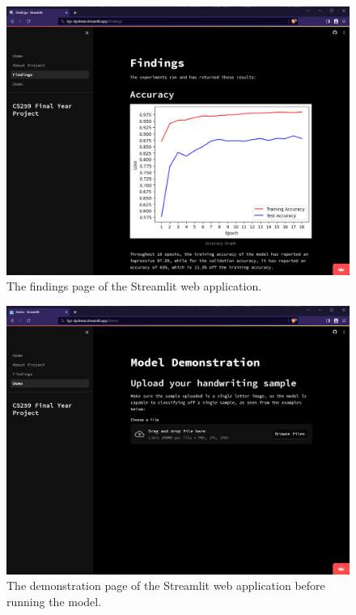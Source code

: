 \begin{figure}[h]
    \centering
    \includegraphics[scale=0.3]{./appendices/images/findings.png}
    \caption{The findings page of the Streamlit web application.}
    \label{fig:home}
\end{figure}

\begin{figure}[h]
    \centering
    \includegraphics[scale=0.3]{./appendices/images/demo_bf.png}
    \caption{The demonstration page of the Streamlit web application before running the model.}
    \label{fig:home}
\end{figure}

